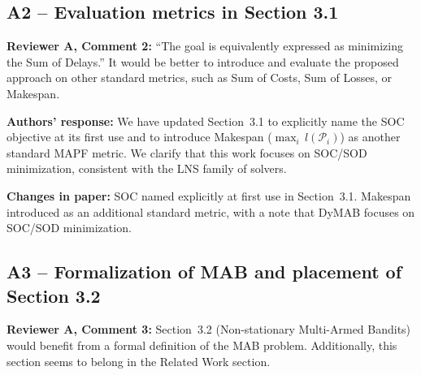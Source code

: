 \documentclass[review]{jair}
\begin{document}
\subsection*{A2 -- Evaluation metrics in Section 3.1}

\begin{reviewerbox}
\textbf{Reviewer A, Comment 2:} ``The goal is equivalently expressed as minimizing the Sum of Delays.'' It would be better to introduce and evaluate the proposed approach on other standard metrics, such as Sum of Costs, Sum of Losses, or Makespan.
\end{reviewerbox}

\begin{authorbox}
\textbf{Authors' response:} We have updated Section~3.1 to explicitly name the SOC objective at its first use and to introduce Makespan ($\max_i\, l(\mathcal{P}_i)$) as another standard MAPF metric. We clarify that this work focuses on SOC/SOD minimization, consistent with the LNS family of solvers.
\end{authorbox}

\begin{changebox}
\textbf{Changes in paper:} SOC named explicitly at first use in Section~3.1. Makespan introduced as an additional standard metric, with a note that DyMAB focuses on SOC/SOD minimization.
\end{changebox}

\subsection*{A3 -- Formalization of MAB and placement of Section 3.2}

\begin{reviewerbox}
\textbf{Reviewer A, Comment 3:} Section~3.2 (Non-stationary Multi-Armed Bandits) would benefit from a formal definition of the MAB problem. Additionally, this section seems to belong in the Related Work section.
\end{reviewerbox}
\end{document}
